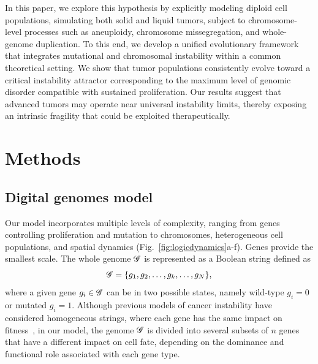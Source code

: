 \documentclass[10pt, aps, rmp,  twocolumn, superscriptaddress, floatfix, showkeys]{revtex4-2}
\begin{document}
In this paper, we explore this hypothesis by explicitly modeling diploid cell populations, simulating both solid and 
liquid tumors, subject to chromosome-level processes such as aneuploidy, chromosome missegregation, and whole-genome 
duplication. To this end, we develop a unified evolutionary framework that integrates mutational and 
chromosomal instability within a common theoretical setting. We show that tumor populations consistently 
evolve toward a critical instability attractor corresponding to the maximum level of genomic disorder 
compatible with sustained proliferation. Our results suggest that advanced tumors may operate near universal 
instability limits, thereby exposing an intrinsic fragility that could be exploited therapeutically.


\section*{Methods}

\subsection*{Digital genomes model}


Our model incorporates multiple levels of complexity, ranging from genes controlling proliferation and mutation to chromosomes, heterogeneous cell populations, and spatial dynamics 
(Fig.~\ref{fig:logicdynamics}a-f). Genes provide the smallest scale. The whole genome $\cal G$ is represented as a Boolean string defined as
\[
{\cal G}= \{ g_1, g_2, \ldots, g_k, \ldots, g_N\},
\]
where a given gene $g_i \in \cal G$ can be in two possible states, namely wild-type $g_i=0$ or mutated $g_i=1$. Although previous models of cancer instability have considered homogeneous strings, where each gene has the same impact on fitness~\cite{Sole2003-ne}, in our model, the genome $\cal G$ is divided into several subsets of $n$ genes that have a different impact on cell fate, depending on the dominance and functional role associated with each gene type.
\end{document}
